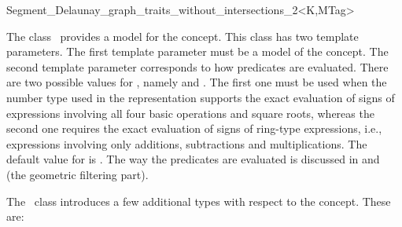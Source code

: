 


\begin{ccRefClass}{Segment_Delaunay_graph_traits_without_intersections_2<K,MTag>}


\ccDefinition
  
The class \ccRefName\ provides a model for the
 concept.
This class has two template parameters. 
The first template parameter must be a model of the 
concept. The second template parameter corresponds to how predicates
are evaluated. There are two possible values for , namely
 and . The first one
must be used when the number type used in the representation supports
the exact evaluation of signs of expressions involving all four basic
operations and square roots, whereas the second one requires the exact
evaluation of signs of ring-type expressions, i.e., expressions
involving only additions, subtractions and multiplications. The
default value for  is .
%
The way the predicates are evaluated is discussed in
\cite{b-ecvdl-96} and \cite{cgal:k-reisv-04} (the geometric filtering
part).



\ccIsModel
{}

\ccTypes
{}

The \ccRefName\ class introduces a few additional types with respect
to the  concept. These are:


\end{ccRefClass}
